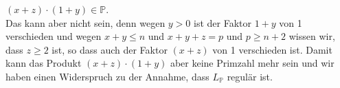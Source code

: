 \documentclass{article}
\begin{document}
\hspace*{1.3cm}
$(x + z) \cdot (1 + y) \in \mathbb{P}$.
\\[0.2cm]
Das kann aber nicht sein, denn wegen $y > 0$ ist der Faktor $1 + y$ von 1
verschieden und wegen $x + y \leq n$ und $x + y + z = p$ und $p \geq n + 2$ wissen wir, dass
$z \geq 2$ ist, so dass auch der Faktor $(x + z)$ von 1 verschieden ist.  Damit kann das Produkt
$(x + z) \cdot (1 + y)$ aber keine Primzahl mehr sein und wir haben einen Widerspruch zu der
Annahme, dass $L_{\mathbb{P}}$ regul\"ar ist.
\end{document}
